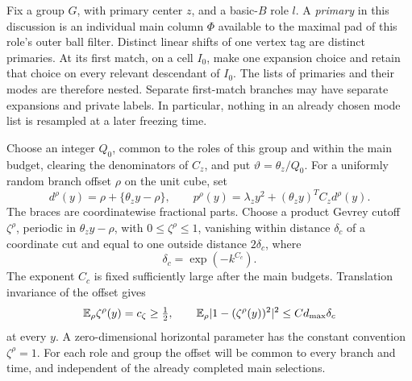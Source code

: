 Fix a group \(G\), with primary center \(z\), and a basic-\(B\) role
\(l\).  A \emph{primary} in this discussion is an individual main
column \(\Phi\) available to the maximal pad of this role's outer ball
filter.  Distinct linear shifts of one vertex tag are distinct
primaries.  At its first match, on a cell \(I_0\), make one expansion
choice and retain that choice on every relevant descendant of \(I_0\).
The lists of primaries and their modes are therefore nested.  Separate
first-match branches may have separate expansions and private labels.
In particular, nothing in an already chosen mode list is resampled at
a later freezing time.

Choose an integer \(Q_0\), common to the roles of this group and within
the main budget, clearing the denominators of \(C_z\), and put
\(\vartheta=\theta_z/Q_0\).
For a uniformly random branch offset \(\rho\) on the unit cube, set
\[
 d^\rho(y)=\rho+\{\theta_z y-\rho\},\qquad
 p^\rho(y)=\lambda_z y^2+(\theta_z y)^T C_zd^\rho(y).
\]
The braces are coordinatewise fractional parts.  Choose a product
Gevrey cutoff \(\zeta^\rho\), periodic in \(\theta_z y-\rho\), with
\(0\le\zeta^\rho\le1\), vanishing within distance \(\delta_c\) of a
coordinate cut and equal to one outside distance \(2\delta_c\), where
\[
 \delta_c=\exp(-k^{C_c}).
\]
The exponent \(C_c\) is fixed sufficiently large after the main
budgets.  Translation invariance of the offset gives
\[
 \mathbb E_\rho\zeta^\rho(y)=c_\zeta\ge\tfrac12,\qquad
 \mathbb E_\rho|1-(\zeta^\rho(y))^2|^2
       \le C d_{\max}\delta_c
\]
at every \(y\).  A zero-dimensional horizontal parameter has the
constant convention \(\zeta^\rho=1\).
For each role and group the offset will be common to every branch and
time, and independent of the already completed main selections.


